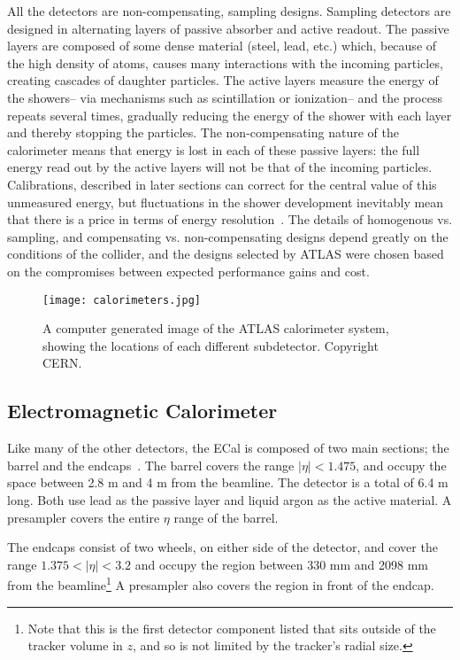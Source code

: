 All the detectors are non-compensating, sampling designs. Sampling detectors are designed in alternating layers of passive absorber and active readout. The passive layers are composed of some dense material (steel, lead, etc.) which, because of the high density of atoms, causes many interactions with the incoming particles, creating cascades of daughter particles. The active layers measure the energy of the showers-- via mechanisms such as scintillation or ionization-- and the process repeats several times, gradually reducing the energy of the shower with each layer and thereby stopping the particles. The non-compensating nature of the calorimeter means that energy is lost in each of these passive layers: the full energy read out by the active layers will not be that of the incoming particles. Calibrations, described in later sections  can correct for the central value of this unmeasured energy, but fluctuations in the shower development inevitably mean that there is a price in terms of energy resolution~\cite{Wigmans}. The details of homogenous vs. sampling, and compensating vs. non-compensating designs depend greatly on the conditions of the collider, and the designs selected by ATLAS were chosen based on the compromises between expected performance gains and cost. 




\begin{figure}
\centering
\texttt{[image: calorimeters.jpg]}
\label{fig:detector:calo}
\caption{A computer generated image of the ATLAS calorimeter system, showing the locations of each different subdetector. Copyright CERN.}
\end{figure}



\subsection{Electromagnetic Calorimeter}

Like many of the other detectors, the ECal is composed of two main sections; the barrel and the endcaps~\cite{ATLASPaper}. The barrel covers the range $|\eta| < 1.475$, and occupy the space between 2.8 m and 4 m from the beamline. The detector is a total of 6.4 m long. Both use lead as the passive layer and liquid argon as the active material. A presampler covers the entire $\eta$ range of the barrel.

The endcaps consist of two wheels, on either side of the detector, and cover the range $1.375 < |\eta| < 3.2$ and occupy the region between 330 mm and 2098 mm from the beamline\footnote{Note that this is the first detector component listed that sits outside of the tracker volume in $z$, and so is not limited by the tracker's radial size.} A presampler also covers the region in front of the endcap.

